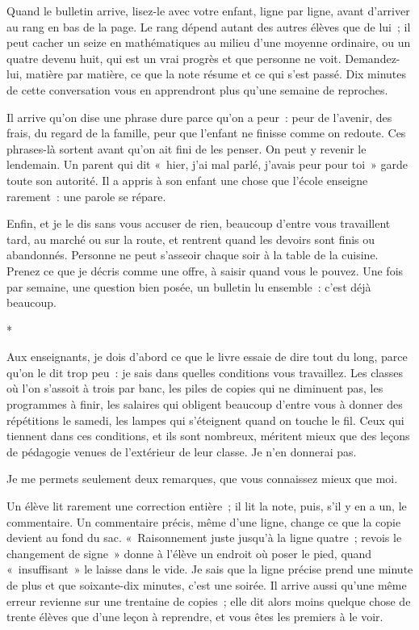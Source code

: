 \documentclass[10.5pt,twoside,openright]{book}
\newcommand{\asterisme}{\par\vspace{0.7em}\centerline{\color{gris}*\quad*\quad*}\vspace{0.7em}\par\noindent}
\begin{document}
Quand le bulletin arrive, lisez-le avec votre enfant, ligne par ligne, avant d’arriver au rang en bas de la page. Le rang dépend autant des autres élèves que de lui ; il peut cacher un seize en mathématiques au milieu d’une moyenne ordinaire, ou un quatre devenu huit, qui est un vrai progrès et que personne ne voit. Demandez-lui, matière par matière, ce que la note résume et ce qui s’est passé. Dix minutes de cette conversation vous en apprendront plus qu’une semaine de reproches.

Il arrive qu’on dise une phrase dure parce qu’on a peur : peur de l’avenir, des frais, du regard de la famille, peur que l’enfant ne finisse comme on redoute. Ces phrases-là sortent avant qu’on ait fini de les penser. On peut y revenir le lendemain. Un parent qui dit « hier, j’ai mal parlé, j’avais peur pour toi » garde toute son autorité. Il a appris à son enfant une chose que l’école enseigne rarement : une parole se répare.

Enfin, et je le dis sans vous accuser de rien, beaucoup d’entre vous travaillent tard, au marché ou sur la route, et rentrent quand les devoirs sont finis ou abandonnés. Personne ne peut s’asseoir chaque soir à la table de la cuisine. Prenez ce que je décris comme une offre, à saisir quand vous le pouvez. Une fois par semaine, une question bien posée, un bulletin lu ensemble : c’est déjà beaucoup.

\asterisme

Aux enseignants, je dois d’abord ce que le livre essaie de dire tout du long, parce qu’on le dit trop peu : je sais dans quelles conditions vous travaillez. Les classes où l’on s’assoit à trois par banc, les piles de copies qui ne diminuent pas, les programmes à finir, les salaires qui obligent beaucoup d’entre vous à donner des répétitions le samedi, les lampes qui s’éteignent quand on touche le fil. Ceux qui tiennent dans ces conditions, et ils sont nombreux, méritent mieux que des leçons de pédagogie venues de l’extérieur de leur classe. Je n’en donnerai pas.

Je me permets seulement deux remarques, que vous connaissez mieux que moi.

Un élève lit rarement une correction entière ; il lit la note, puis, s’il y en a un, le commentaire. Un commentaire précis, même d’une ligne, change ce que la copie devient au fond du sac. « Raisonnement juste jusqu’à la ligne quatre ; revois le changement de signe » donne à l’élève un endroit où poser le pied, quand « insuffisant » le laisse dans le vide. Je sais que la ligne précise prend une minute de plus et que soixante-dix minutes, c’est une soirée. Il arrive aussi qu’une même erreur revienne sur une trentaine de copies ; elle dit alors moins quelque chose de trente élèves que d’une leçon à reprendre, et vous êtes les premiers à le voir.
\end{document}
